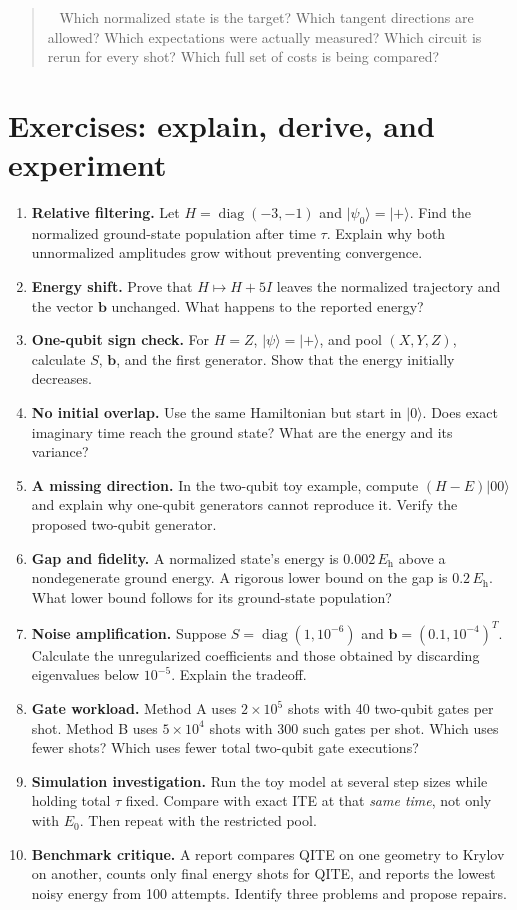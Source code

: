 \documentclass[11pt,a4paper]{article}
\newcommand{\ket}[1]{\lvert #1\rangle}
\newcommand{\Eh}{E_{\mathrm h}}
\newcommand{\lesson}[2]{\clearpage\section{#1}\label{#2}}
\newenvironment{idea}[1][Main idea]{\par\smallskip\begin{quotation}\noindent{\bfseries\textcolor{keyblue}{#1.}}\ }{\end{quotation}\smallskip}
\begin{document}
\begin{idea}[Five questions that prevent most mistakes]
Which normalized state is the target? Which tangent directions are allowed? Which expectations were actually measured? Which circuit is rerun for every shot? Which full set of costs is being compared?
\end{idea}

\lesson{Exercises: explain, derive, and experiment}{sec:exercises}
\begin{enumerate}
\item \textbf{Relative filtering.} Let $H=\operatorname{diag}(-3,-1)$ and $\ket{\psi_0}=\ket{+}$. Find the normalized ground-state population after time $\tau$. Explain why both unnormalized amplitudes grow without preventing convergence.
\item \textbf{Energy shift.} Prove that $H\mapsto H+5I$ leaves the normalized trajectory and the vector $\bm b$ unchanged. What happens to the reported energy?
\item \textbf{One-qubit sign check.} For $H=Z$, $\ket{\psi}=\ket{+}$, and pool $(X,Y,Z)$, calculate $S$, $\bm b$, and the first generator. Show that the energy initially decreases.
\item \textbf{No initial overlap.} Use the same Hamiltonian but start in $\ket{0}$. Does exact imaginary time reach the ground state? What are the energy and its variance?
\item \textbf{A missing direction.} In the two-qubit toy example, compute $(H-E)\ket{00}$ and explain why one-qubit generators cannot reproduce it. Verify the proposed two-qubit generator.
\item \textbf{Gap and fidelity.} A normalized state's energy is $0.002\,\Eh$ above a nondegenerate ground energy. A rigorous lower bound on the gap is $0.2\,\Eh$. What lower bound follows for its ground-state population?
\item \textbf{Noise amplification.} Suppose $S=\operatorname{diag}(1,10^{-6})$ and $\bm b=(0.1,10^{-4})^T$. Calculate the unregularized coefficients and those obtained by discarding eigenvalues below $10^{-5}$. Explain the tradeoff.
\item \textbf{Gate workload.} Method A uses $2\times10^5$ shots with 40 two-qubit gates per shot. Method B uses $5\times10^4$ shots with 300 such gates per shot. Which uses fewer shots? Which uses fewer total two-qubit gate executions?
\item \textbf{Simulation investigation.} Run the toy model at several step sizes while holding total $\tau$ fixed. Compare with exact ITE at that \emph{same time}, not only with $E_0$. Then repeat with the restricted pool.
\item \textbf{Benchmark critique.} A report compares QITE on one geometry to Krylov on another, counts only final energy shots for QITE, and reports the lowest noisy energy from 100 attempts. Identify three problems and propose repairs.
\end{enumerate}
\end{document}
